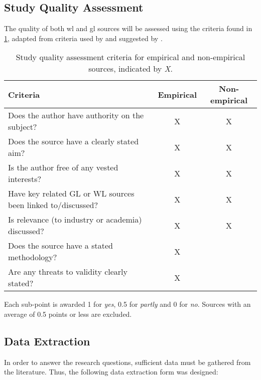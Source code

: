 \subsection{Study Quality Assessment}
The quality of both \acrshort{wl} and \acrshort{gl} sources will be assessed using the criteria found in \cref{tab:study_quality_criteria}, adapted from criteria used by \cite{Giray2021} and suggested by \cite{Garousi2016}.
\begin{table}[h]
    \centering
    \begin{tabular}{l c c}
        Criteria & Empirical & Non-empirical \\
        \hline
        Does the author have authority on the subject? & X & X \\
        Does the source have a clearly stated aim? & X & X \\
        Is the author free of any vested interests? & X & X \\
        Have key related GL or WL sources been linked to/discussed? & X & X \\
        Is relevance (to industry or academia) discussed? & X & X \\
        Does the source have a stated methodology? & X &  \\
        Are any threats to validity clearly stated? & X & \\
    \end{tabular}
    \caption{Study quality assessment criteria for empirical and non-empirical sources, indicated by \emph{X}.}
    \label{tab:study_quality_criteria}
\end{table}
Each sub-point is awarded 1 for \emph{yes}, 0.5 for \emph{partly} and 0 for \emph{no}.
Sources with an average of 0.5 points or less are excluded.

\subsection{Data Extraction}
\label{sec:method:data_extraction}
In order to answer the research questions, sufficient data must be gathered from the literature.
Thus, the following data extraction form was designed:

